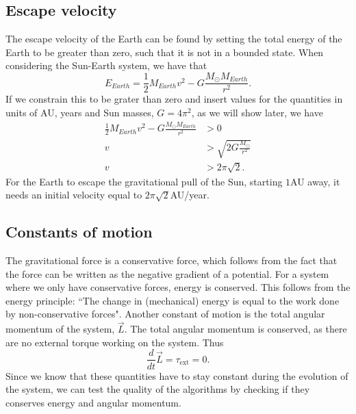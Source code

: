 \documentclass[%
 reprint,
nofootinbib,
aps,
]{revtex4-1}
\begin{document}
\subsection{Escape velocity}
The escape velocity of the Earth can be found by setting the total energy of the Earth to be greater than zero, such that it is not in a bounded state. When considering the Sun-Earth system, we have that
\begin{equation}
E_{Earth} = \frac{1}{2}M_{Earth}v^2 -G\frac{M_\odot M_{Earth}}{r^2}.
\end{equation}
If we constrain this to be grater than zero and insert values for the quantities in units of AU, years and Sun masses, $G = 4\pi^2$, as we will show later, we have
\begin{align}
\frac{1}{2}M_{Earth}v^2 -G\frac{M_\odot M_{Earth}}{r^2} &> 0\\
v &> \sqrt{2G\frac{M_\odot }{r^2}}\\
v &> 2\pi\sqrt{2}.
\end{align}
For the Earth to escape the gravitational pull of the Sun, starting $1$AU away, it needs an initial velocity equal to $2\pi\sqrt{2}$AU/year.

\subsection{Constants of motion}\label{const_mot}



The gravitational force is a conservative force, which follows from the fact that the force can be written as the negative gradient of a potential. For a system where we only have conservative forces, energy is conserved. This follows from the energy principle: ``The change in (mechanical) energy is equal to the work done by non-conservative forces"\cite{malthe}. Another constant of motion is the total angular momentum of the system, $\vec{L}$. The total angular momentum is conserved, as there are no external torque working on the system. Thus
\begin{equation}
\frac{d}{dt}\vec{L} = \tau_{\mathrm{ext}} = 0.
\end{equation}
Since we know that these quantities have to stay constant during the evolution of the system, we can test the quality of the algorithms by checking if they conserves energy and angular momentum.
\end{document}
